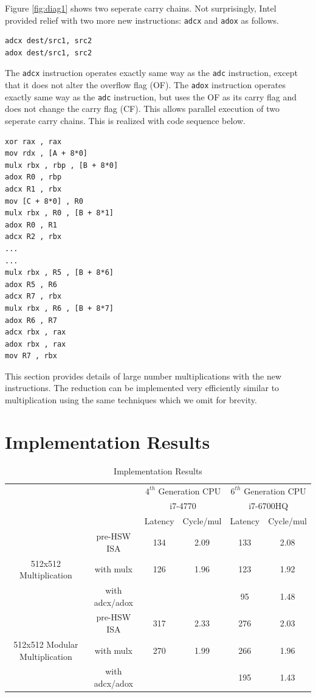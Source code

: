\documentclass[twocolumn]{svjour3}          %
\begin{document}
Figure \ref{fig:diag1} shows two seperate carry chains.
Not surprisingly, Intel provided relief with two more new instructions: \texttt{adcx} and \texttt{adox} as follows.

\begin{verbatim}
adcx dest/src1, src2
adox dest/src1, src2
\end{verbatim}

The \texttt{adcx} instruction operates exactly same way as the \texttt{adc} instruction, except that it does not alter the overflow flag (OF).
The \texttt{adox} instruction operates exactly same way as the \texttt{adc} instruction, but uses the OF as its carry flag and does not change the carry flag (CF). This allows parallel execution of two seperate carry chains. This is realized with code sequence below. 

\begin{verbatim}
xor rax , rax
mov rdx , [A + 8*0]
mulx rbx , rbp , [B + 8*0]
adox R0 , rbp
adcx R1 , rbx
mov [C + 8*0] , R0
mulx rbx , R0 , [B + 8*1]
adox R0 , R1
adcx R2 , rbx
...
...
mulx rbx , R5 , [B + 8*6]
adox R5 , R6
adcx R7 , rbx
mulx rbx , R6 , [B + 8*7]
adox R6 , R7
adcx rbx , rax
adox rbx , rax
mov R7 , rbx
\end{verbatim}

This section provides details of large number multiplications with the new instructions.
The reduction can be implemented very efficiently similar to multiplication using the same techniques
which we omit for brevity.

\section{Implementation Results}
\label{sec:res}

\begin{table}[ht]
\caption{Implementation Results}
\label{table:impres}
\begin{center}
\begin{tabular}{|c|c|c|c|c|c|}
\hline
\multicolumn{2}{|c|}{}	& \multicolumn{2}{c|}{$4^{th}$ Generation CPU} & \multicolumn{2}{c|}{$6^{th}$ Generation CPU} \\
\multicolumn{2}{|c|}{}	& \multicolumn{2}{c|}{i7-4770} & \multicolumn{2}{c|}{i7-6700HQ} \\
\cline{3-6}
\multicolumn{2}{|c|}{}	& Latency & Cycle/mul & Latency & Cycle/mul \\
\hline
 & pre-HSW ISA & 134 & 2.09 & 133 & 2.08 \\
\cline{2-6}
512x512 Multiplication & with mulx & 126 & 1.96 & 123 & 1.92 \\
\cline{2-6}
 & with adcx/adox &  &  & 95 & 1.48 \\
\hline
 & pre-HSW ISA & 317 & 2.33 & 276 & 2.03 \\
\cline{2-6}
512x512 Modular Multiplication & with mulx & 270 & 1.99 & 266 & 1.96 \\
\cline{2-6}
 & with adcx/adox &  &  & 195 & 1.43 \\
\hline
\end{tabular}
\end{center}
\end{table}
\end{document}
